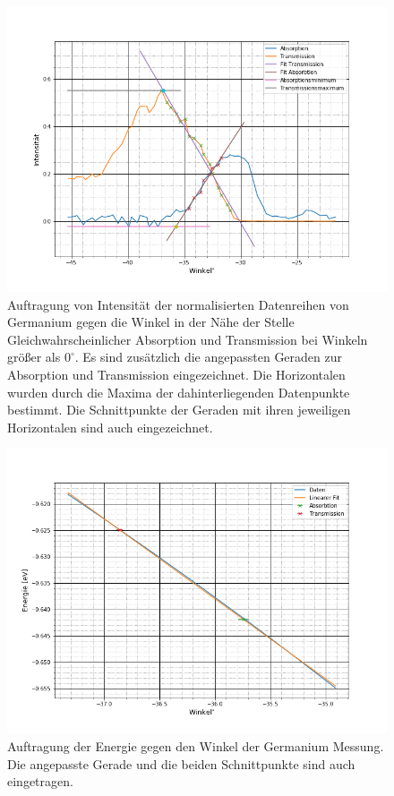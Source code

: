 \begin{figure}
	\includegraphics[scale=0.5]{Bilder/anhang/ge_r}
	\caption[Geraden Anpassungen Germanium Messung links]{\small Auftragung von Intensität der normalisierten Datenreihen von Germanium gegen die  Winkel in der Nähe der Stelle Gleichwahrscheinlicher Absorption und Transmission bei Winkeln größer als $0^\circ$. Es sind zusätzlich die angepassten Geraden zur Absorption und Transmission eingezeichnet. Die Horizontalen wurden durch die Maxima der dahinterliegenden Datenpunkte bestimmt. Die Schnittpunkte der Geraden mit ihren jeweiligen Horizontalen sind auch eingezeichnet.}
\end{figure}
\begin{figure}
	\includegraphics[scale=0.5]{Bilder/anhang/ge_l_energie}
	\centering
	\caption[Energiebestimmung Ge Messung links]{\small Auftragung der Energie gegen den Winkel der Germanium Messung. Die angepasste Gerade und die beiden Schnittpunkte sind auch eingetragen.}
\end{figure}



